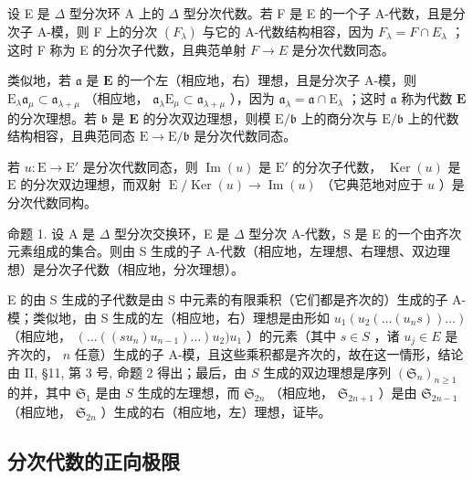 设 E 是 \(\Delta\) 型分次环 A 上的 \(\Delta\) 型分次代数。若 F 是 E 的一个子 A-代数，且是分次子 A-模，则 F 上的分次 \((F_{\lambda})\) 与它的 A-代数结构相容，因为 \(F_{\lambda} = F \cap E_{\lambda}\) ；这时 F 称为 E 的分次子代数，且典范单射 \(F \to E\) 是分次代数同态。

类似地，若 \(\mathfrak{a}\) 是 \(\mathbf{E}\) 的一个左（相应地，右）理想，且是分次子 A-模，则 \(\mathrm{E}_{\lambda}\mathfrak{a}_{\mu} \subset \mathfrak{a}_{\lambda + \mu}\) （相应地， \(\mathfrak{a}_{\lambda}\mathrm{E}_{\mu} \subset \mathfrak{a}_{\lambda + \mu}\) ），因为 \(\mathfrak{a}_{\lambda} = \mathfrak{a} \cap \mathrm{E}_{\lambda}\) ；这时 \(\mathfrak{a}\) 称为代数 \(\mathbf{E}\) 的分次理想。若 \(\mathfrak{b}\) 是 \(\mathbf{E}\) 的分次双边理想，则模 \(\mathrm{E} / \mathfrak{b}\) 上的商分次与 \(\mathrm{E} / \mathfrak{b}\) 上的代数结构相容，且典范同态 \(\mathrm{E} \to \mathrm{E} / \mathfrak{b}\) 是分次代数同态。

若 \(u: \mathrm{E} \to \mathrm{E}'\) 是分次代数同态，则 \(\operatorname{Im}(u)\) 是 \(\mathrm{E}'\) 的分次子代数， \(\operatorname{Ker}(u)\) 是 \(\mathrm{E}\) 的分次双边理想，而双射 \(\operatorname{E} / \operatorname{Ker}(u) \to \operatorname{Im}(u)\) （它典范地对应于 \(u\) ）是分次代数同构。

命题 1. 设 A 是 \(\Delta\) 型分次交换环，E 是 \(\Delta\) 型分次 A-代数，S 是 E 的一个由齐次元素组成的集合。则由 S 生成的子 A-代数（相应地，左理想、右理想、双边理想）是分次子代数（相应地，分次理想）。

E 的由 S 生成的子代数是由 S 中元素的有限乘积（它们都是齐次的）生成的子 A-模；类似地，由 S 生成的左（相应地，右）理想是由形如 \(u_{1}(u_{2}(\ldots(u_{n}s))\ldots)\) （相应地， \((\ldots((su_{n})u_{n-1})\ldots)u_{2})u_{1}\) ）的元素（其中 \(s \in S\) ，诸 \(u_{j} \in E\) 是齐次的， \(n\) 任意）生成的子 A-模，且这些乘积都是齐次的，故在这一情形，结论由 II, §11, 第 3 号, 命题 2 得出；最后，由 \(S\) 生成的双边理想是序列 \((\mathfrak{S}_{n})_{n \geqslant 1}\) 的并，其中 \(\mathfrak{S}_{1}\) 是由 \(S\) 生成的左理想，而 \(\mathfrak{S}_{2n}\) （相应地， \(\mathfrak{S}_{2n+1}\) ）是由 \(\mathfrak{S}_{2n-1}\) （相应地， \(\mathfrak{S}_{2n}\) ）生成的右（相应地，左）理想，证毕。

\subsection{分次代数的正向极限}

